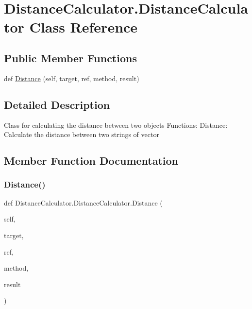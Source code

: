 \hypertarget{class_distance_calculator_1_1_distance_calculator}{}\section{Distance\+Calculator.\+Distance\+Calculator Class Reference}
\label{class_distance_calculator_1_1_distance_calculator}
\subsection*{Public Member Functions}
\begin{DoxyCompactItemize}
\item 
def \mbox{\hyperlink{class_distance_calculator_1_1_distance_calculator_a9769335e5fce2afab3640c94e7fa15bd}{Distance}} (self, target, ref, method, result)
\end{DoxyCompactItemize}


\subsection{Detailed Description}
\begin{DoxyVerb}Class for calculating the distance between two objects
Functions:
    Distance: Calculate the distance between two strings of vector
\end{DoxyVerb}
 

\subsection{Member Function Documentation}
\mbox{\label{class_distance_calculator_1_1_distance_calculator_a9769335e5fce2afab3640c94e7fa15bd}} 
\subsubsection{\texorpdfstring{Distance()}{Distance()}}
{\footnotesize\ttfamily def Distance\+Calculator.\+Distance\+Calculator.\+Distance (\begin{DoxyParamCaption}\item[{}]{self,  }\item[{}]{target,  }\item[{}]{ref,  }\item[{}]{method,  }\item[{}]{result }\end{DoxyParamCaption})}


